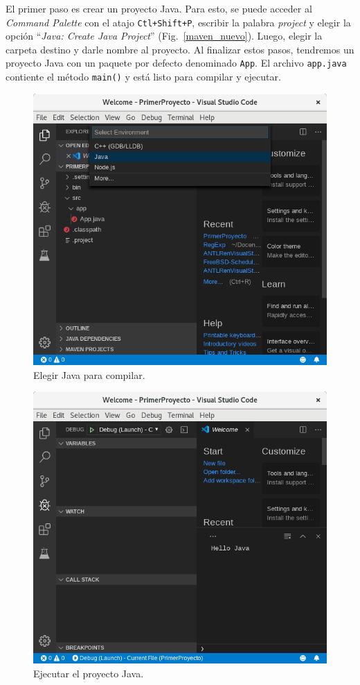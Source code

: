 El primer paso es crear un proyecto Java.  Para esto, se puede acceder al \emph{Command Palette} con el atajo \verb|Ctl+Shift+P|, escribir la palabra \emph{project} y elegir la opción ``\emph{Java: Create Java Project}'' (Fig.~\ref{maven_nuevo}). Luego, elegir la carpeta destino y darle nombre al proyecto.  Al finalizar estos pasos, tendremos un proyecto Java con un paquete por defecto denominado \verb|App|.  El archivo \verb|app.java| contiente el método \verb|main()| y está listo para compilar y ejecutar.


\begin{figure}[t]
	\centering
	\includegraphics[width=.95\textwidth]{img/PrimerCompilacion}
	\caption{Elegir Java para compilar.}
	\label{java_project}
\end{figure}

\begin{figure}[t]
	\centering
	\includegraphics[width=.95\textwidth]{img/PrimeraEjecucion}
	\caption{Ejecutar el proyecto Java.}
	\label{hello_java}
\end{figure}


